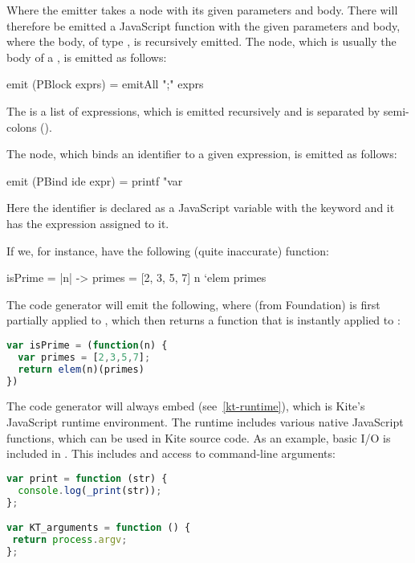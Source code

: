 Where the emitter takes a  node with its given parameters and body. There will therefore be emitted a JavaScript function with the given parameters and body, where the body, of type , is recursively emitted. The  node, which is usually the body of a , is emitted as follows:

\begin{haskell}
emit (PBlock exprs) = emitAll ";" exprs
\end{haskell}

The  is a list of expressions, which is emitted recursively and is separated by semi-colons (\code{;}).

The  node, which binds an identifier to a given expression, is emitted as follows:
\begin{haskell}
emit (PBind ide expr) =
  printf "var %
\end{haskell}
Here the identifier is declared as a JavaScript variable with the keyword  and it has the expression assigned to it.

If we, for instance, have the following (quite inaccurate) function:
\begin{kite}
isPrime = |n| -> {
  primes = [2, 3, 5, 7]
  n `elem primes
}
\end{kite}

The code generator will emit the following, where  (from Foundation) is first partially applied to , which then returns a function that is instantly applied to :
\begin{lstlisting}[language=Javascript]
var isPrime = (function(n) {
  var primes = [2,3,5,7];
  return elem(n)(primes)
})
\end{lstlisting}

The code generator will always embed  (see~\ref{kt-runtime}), which is Kite's JavaScript runtime environment. The runtime includes various native JavaScript functions, which can be used in Kite source code. As an example, basic I/O is included in . This includes  and access to command-line arguments:
\begin{lstlisting}[language=Javascript]
var print = function (str) {
  console.log(_print(str));
};

var KT_arguments = function () {
 return process.argv;
};
\end{lstlisting}
